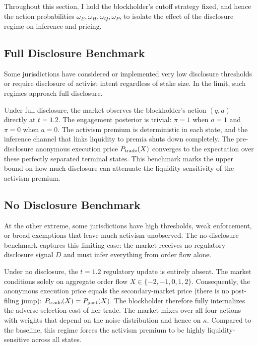\documentclass[11pt]{article}
\newcommand{\1}{\mathbf{1}}
\begin{document}
Throughout this section, I hold the blockholder's cutoff strategy fixed, and hence the action probabilities $\omega_E,\omega_H,\omega_Q,\omega_P$, to isolate the effect of the disclosure regime on inference and pricing.

%
\subsection{Full Disclosure Benchmark}
%

Some jurisdictions have considered or implemented very low disclosure thresholds or require disclosure of activist intent regardless of stake size. In the limit, such regimes approach full disclosure.

Under full disclosure, the market observes the blockholder's action $(q,a)$ directly at $t=1.2$. The engagement posterior is trivial: $\pi=1$ when $a=1$ and $\pi=0$ when $a=0$. The activism premium is deterministic in each state, and the inference channel that links liquidity to premia shuts down completely. The pre-disclosure anonymous execution price $P_{\textup{trade}}(X)$ converges to the expectation over these perfectly separated terminal states. This benchmark marks the upper bound on how much disclosure can attenuate the liquidity-sensitivity of the activism premium.

%
\subsection{No Disclosure Benchmark}
%

At the other extreme, some jurisdictions have high thresholds, weak enforcement, or broad exemptions that leave much activism unobserved. The no-disclosure benchmark captures this limiting case: the market receives no regulatory disclosure signal $D$ and must infer everything from order flow alone.

Under no disclosure, the $t=1.2$ regulatory update is entirely absent. The market conditions solely on aggregate order flow $X\in\{-2,-1,0,1,2\}$. Consequently, the anonymous execution price equals the secondary-market price (there is no post-filing jump): $P_{\textup{trade}}(X) = P_{\textup{post}}(X)$. The blockholder therefore fully internalizes the adverse-selection cost of her trade. The market mixes over all four actions with weights that depend on the noise distribution and hence on $\kappa$. Compared to the baseline, this regime forces the activism premium to be highly liquidity-sensitive across all states.
\end{document}
